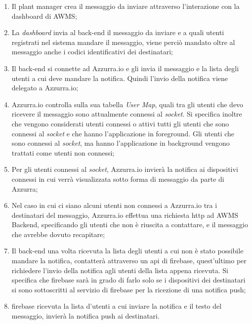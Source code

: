 \begin{enumerate}
	\item Il \gls{plant manager}\ap{[g]} crea il messaggio da inviare attraverso l'interazione con la dashboard di \gls{AWMS};
	\item La \emph{dashboard} invia al back-end il messaggio da inviare e a quali utenti registrati nel sistema mandare il messaggio, viene perciò mandato oltre al messaggio anche i codici identificativi dei destinatari;
	\item Il back-end si connette ad Azzurra.io e gli invia il messaggio e la lista degli utenti a cui deve mandare la notifica. Quindi l'invio della notifica viene delegato a Azzurra.io; 
	\item Azzurra.io controlla sulla sua tabella \emph{User Map}, quali tra gli utenti che devo ricevere il messaggio sono attualmente connessi al \emph{socket}. Si specifica inoltre che vengono considerati utenti connessi o attivi tutti gli utenti che sono connessi al \emph{socket} e che hanno l’applicazione in \gls{foreground}\ap{[g]}. Gli utenti che sono connessi al \emph{socket}, ma hanno l’applicazione in \gls{background}\ap{[g]} vengono trattati come utenti non connessi;
	\item Per gli utenti connessi al \emph{socket}, Azzurra.io invierà la notifica ai dispositivi connessi in cui verrà visualizzata sotto forma di messaggio da parte di Azzurra;
	\item Nel caso in cui ci siano alcuni utenti non connessi a Azzurra.io tra i destinatari del messaggio, Azzurra.io effettua una richiesta \gls{http}\ap{[g]} ad AWMS Backend, specificando gli utenti che non è riuscita a contattare, e il messaggio che avrebbe dovuto recapitare;
	\item Il back-end una volta ricevuta la lista degli utenti a cui non è stato possibile mandare la notifica, contatterà attraverso un \gls{api}\ap{[g]} di \gls{firebase}\ap{[g]}, quest'ultimo per richiedere l'invio della notifica agli utenti della lista appena ricevuta. Si specifica che \gls{firebase}\ap{[g]} sarà in grado di farlo solo se i dispositivi dei destinatari si sono sottoscritti al servizio di \gls{firebase}\ap{[g]} per la ricezione di una \gls{notifica push}\ap{[g]};
	\item \gls{firebase}\ap{[g]} ricevuta la lista d'utenti a cui inviare la notifica e il testo del messaggio, invierà la \gls{notifica push}\ap{[g]} ai destinatari.
\end{enumerate}